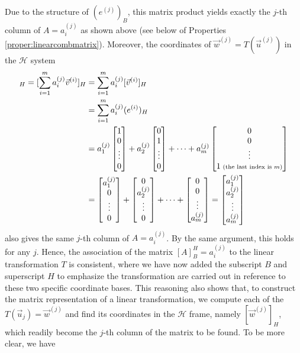 Due to the structure of $(e^{(j)})_B$, this matrix product yields exactly the $j$-th column of $A = a_i^{(j)}$ as shown above (see below of Properties \ref{proper:linearcombmatrix}). Moreover, the coordinates of $\vec{w}^{(j)} = T(\vec{u}^{(j)})$ in the $\mathcal{H}$ system
\begin{align*}
[\vec{w}^{(j)}]_H = [\sum_{i=1}^{m} a_i^{(j)}\vec{v}^{(i)}]_H &= \sum_{i=1}^{m} a_i^{(j)}[\vec{v}^{(i)}]_H \\
&= \sum_{i=1}^{m} a_i^{(j)}(e^{(i)})_H \\
&=  a_1^{(j)} \begin{bmatrix}
1 \\
0 \\
\vdots \\
0
\end{bmatrix}
+
a_2^{(j)} \begin{bmatrix}
0 \\
1 \\
\vdots \\
0
\end{bmatrix}
+ \cdots
+
a_m^{(j)} \begin{bmatrix}
0 \\
0 \\
\vdots \\
1 {\scriptsize \text{ (the last index is $m$)}}
\end{bmatrix}
\\
&= \begin{bmatrix}
a_1^{(j)} \\
0 \\
\vdots \\
0
\end{bmatrix}
+
\begin{bmatrix}
0 \\
a_2^{(j)} \\
\vdots \\
0
\end{bmatrix}
+ \cdots
+
\begin{bmatrix}
0 \\
0 \\
\vdots \\
a_m^{(j)}
\end{bmatrix}
=
\begin{bmatrix}
a_1^{(j)} \\
a_2^{(j)} \\
\vdots \\
a_m^{(j)}
\end{bmatrix}
\end{align*}
also gives the same $j$-th column of $A = a_i^{(j)}$. By the same argument, this holds for any $j$. Hence, the association of the matrix $[A]_B^H = a_i^{(j)}$ to the linear transformation $T$ is consistent, where we have now added the subscript $B$ and superscript $H$ to emphasize the transformation are carried out in reference to these two specific coordinate bases. This reasoning also shows that, to construct the matrix representation of a linear transformation, we compute each of the $T(\vec{u}_j) = \vec{w}^{(j)}$ and find its coordinates in the $\mathcal{H}$ frame, namely $[\vec{w}^{(j)}]_H$, which readily become the $j$-th column of the matrix to be found. To be more clear, we have
